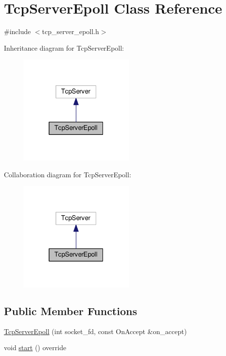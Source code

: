 \hypertarget{classTcpServerEpoll}{}\section{Tcp\+Server\+Epoll Class Reference}
\label{classTcpServerEpoll}


{\ttfamily \#include $<$tcp\+\_\+server\+\_\+epoll.\+h$>$}



Inheritance diagram for Tcp\+Server\+Epoll\+:
\nopagebreak
\begin{figure}[H]
\begin{center}
\leavevmode
\includegraphics[width=163pt]{classTcpServerEpoll__inherit__graph}
\end{center}
\end{figure}


Collaboration diagram for Tcp\+Server\+Epoll\+:
\nopagebreak
\begin{figure}[H]
\begin{center}
\leavevmode
\includegraphics[width=163pt]{classTcpServerEpoll__coll__graph}
\end{center}
\end{figure}
\subsection*{Public Member Functions}
\begin{DoxyCompactItemize}
\item 
\hyperlink{classTcpServerEpoll_aaf7ecde753d57703ac9fbf21e489ea22}{Tcp\+Server\+Epoll} (int socket\+\_\+fd, const On\+Accept \&on\+\_\+accept)
\item 
void \hyperlink{classTcpServerEpoll_a03ad291fa33bf9749e9b940337c56064}{start} () override
\end{DoxyCompactItemize}


